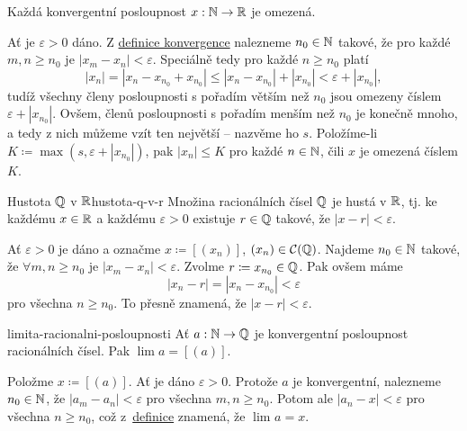 \begin{lemma}{}{}
 Každá konvergentní posloupnost $x:\mathbb{N} \to \mathbb{R}$ je omezená.
\end{lemma}
\begin{lemproof}
 Ať je $\varepsilon>0$ dáno. Z \hyperref[def:konvergentni-posloupnost]{definice
 konvergence} nalezneme $n_0 \in \mathbb{N}$ takové, že pro každé $m,n \geq n_0$ je
 $|x_m - x_n| < \varepsilon$. Speciálně tedy pro každé $n \geq n_0$ platí
 \[
  |x_n| = |x_n - x_{n_0} + x_{n_0}| \leq |x_n - x_{n_0}| + |x_{n_0}| <
  \varepsilon + |x_{n_0}|,
 \]
 tudíž všechny členy posloupnosti s pořadím větším než $n_0$ jsou omezeny číslem
 $\varepsilon + |x_{n_0}|$. Ovšem, členů posloupnosti s pořadím menším než $n_0$
 je konečně mnoho, a tedy z nich můžeme vzít ten největší -- nazvěme ho $s$.
 Položíme-li $K \coloneqq \max(s,\varepsilon + |x_{n_0}|)$, pak $|x_n| \leq K$
 pro každé $n \in \mathbb{N}$, čili $x$ je omezená číslem $K$.
\end{lemproof}

\begin{proposition}{Hustota $\mathbb{Q}$ v $\mathbb{R}$}{hustota-q-v-r}
 Množina racionálních čísel $\mathbb{Q}$ je hustá v $\mathbb{R}$, tj. ke každému $x \in \mathbb{R}$ a
 každému $\varepsilon>0$ existuje $r \in \mathbb{Q}$ takové, že $|x-r|<\varepsilon$.
\end{proposition}
\begin{propproof}
 Ať $\varepsilon>0$ je dáno a označme $x \coloneqq [(x_n)]$, $(x_n) \in
 \mathcal{C}(\mathbb{Q})$. Najdeme $n_0 \in \mathbb{N}$ takové, že $ \forall m,n \geq n_0$ je
 $|x_m - x_n|<\varepsilon$. Zvolme $r \coloneqq x_{n_0} \in \mathbb{Q}$. Pak ovšem máme
 \[
  |x_n - r| = |x_n - x_{n_0}| < \varepsilon
 \]
 pro všechna $n \geq n_0$. To přesně znamená, že $|x - r| < \varepsilon$.
\end{propproof}

\begin{lemma}{}{limita-racionalni-posloupnosti}
 Ať $a:\mathbb{N} \to \mathbb{Q}$ je konvergentní posloupnost racionálních čísel. Pak $\lim a =
 [(a)]$.
\end{lemma}
\begin{lemproof}
 Položme $x \coloneqq [(a)]$. Ať je dáno $\varepsilon>0$. Protože $a$ je
 konvergentní, nalezneme $n_0 \in \mathbb{N}$, že $|a_m - a_n|<\varepsilon$ pro všechna
 $m,n \geq n_0$. Potom ale $|a_n - x|<\varepsilon$ pro všechna $n \geq n_0$, což
 z~\hyperref[def:limita-posloupnosti]{definice} znamená, že $\lim_{} a = x$.
\end{lemproof}

